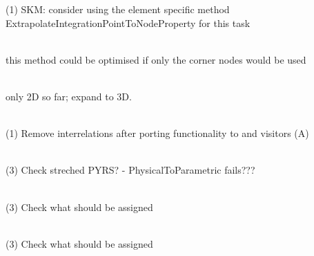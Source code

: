 \begin{DoxyRefList}
(1) SKM\+: consider using the element specific method Extrapolate\+Integration\+Point\+To\+Node\+Property for this task 
\item[Member \doxylink{classcsmp_1_1_inter_face_a7b7b0aaed868b05d8f7fd61736e40fbe}{csmp\+::Inter\+Face\texorpdfstring{$<$}{<} dim \texorpdfstring{$>$}{>}\+::Length\+In\+Direction} (const \doxylink{classcsmp_1_1_vector_variable}{Vector\+Variable$<$ dim $>$} \&vec\+Direction) const]\hfill \\
\label{todo__todo000151}%
%
this method could be optimised if only the corner nodes would be used 
\item[Class \doxylink{classcsmp_1_1_inter_face___test}{csmp\+::Inter\+Face\+\_\+\+Test} ]\hfill \\
\label{todo__todo000247}%
%
only 2D so far; expand to 3D.  
\item[Class \doxylink{classcsmp_1_1_interrelation}{csmp\+::Interrelation\texorpdfstring{$<$}{<} dim \texorpdfstring{$>$}{>}} ]\hfill \\
\label{todo__todo000036}%
%
(1) Remove interrelations after porting functionality to  and visitors (A) 
\item[Member \doxylink{classcsmp_1_1_isoparametric_linear_pyramid_a9e24a277013e5dac247c01a21c3fd135}{csmp\+::Isoparametric\+Linear\+Pyramid\+::Isoparametric\+Linear\+Pyramid} (uint32\+\_\+t integration\+Points=5)]\hfill \\
\label{todo__todo000072}%
%
(3) Check streched PYRS? -\/ Physical\+To\+Parametric fails???  
\item[Member \doxylink{classcsmp_1_1_isoparametric_linear_quadrilateral_a5752cf3324a52fb32e50aa1832c4627f}{csmp\+::Isoparametric\+Linear\+Quadrilateral\+::Mid\+Side\+Nodes} (std\+::vector$<$ uint32\+\_\+t $>$ \&ids) const]\hfill \\
\label{todo__todo000073}%
%
(3) Check what should be assigned  
\item[Member \doxylink{classcsmp_1_1_isoparametric_linear_triangle_aa73e9c9a122dea5ae043c0d4afa4b15a}{csmp\+::Isoparametric\+Linear\+Triangle\+::Mid\+Side\+Nodes} (std\+::vector$<$ uint32\+\_\+t $>$ \&ids) const]\hfill \\
\label{todo__todo000074}%
%
(3) Check what should be assigned  
\item[Member \doxylink{classcsmp_1_1_isoparametric_quadratic_prism_af04285d753b54356da3d2fe8e80e2df4}{csmp\+::Isoparametric\+Quadratic\+Prism\+::d\+N\+\_\+\+At\+Barycenter} (\doxylink{classcsmp_1_1_dense_matrix}{Dense\+Matrix$<$ DM\+\_\+\+MIN $>$} \&M)]\hfill \\

\end{DoxyRefList}
